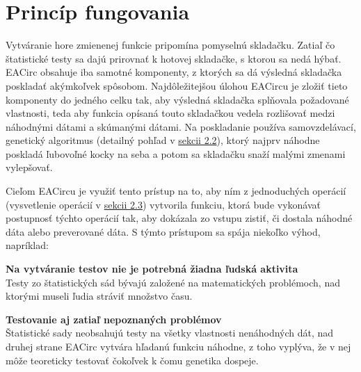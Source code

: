 \section{Princíp fungovania}
\label{sec:principle}

Vytváranie hore zmienenej funkcie pripomína pomyselnú skladačku. Zatiaľ čo štatistické testy sa dajú prirovnať k hotovej skladačke, s ktorou sa nedá hýbať. EACirc obsahuje iba samotné komponenty, z ktorých sa dá výsledná skladačka poskladať akýmkoľvek spôsobom. Najdôležitejšou úlohou EACircu je zložiť tieto komponenty do jedného celku tak, aby výsledná skladačka splňovala požadované vlastnosti, teda aby funkcia opísaná touto skladačkou vedela rozlišovať medzi náhodnými dátami a skúmanými dátami. Na poskladanie používa samovzdelávací, genetický algoritmus (detailný pohľad v \hyperref[sec:genetics]{sekcii 2.2}), ktorý najprv náhodne poskladá ľubovoľné kocky na seba a potom sa skladačku snaží malými zmenami vylepšovať.

Cieľom EACircu je využiť tento prístup na to, aby ním z jednoduchých operácií (vysvetlenie operácií v \hyperref[sec:nodes]{sekcii 2.3}) vytvorila funkciu, ktorá bude vykonávať postupnosť týchto operácií tak, aby dokázala zo vstupu zistiť, či dostala náhodné dáta alebo preverované dáta. S týmto prístupom sa spája niekoľko výhod, napríklad:
\begin{myItemize}
	\item \textbf{Na vytváranie testov nie je potrebná žiadna ľudská aktivita}\\Testy zo štatistických sád bývajú založené na matematických problémoch, nad ktorými museli ľudia stráviť množstvo času.
	\item \textbf{Testovanie aj zatiaľ nepoznaných problémov}\\Štatistické sady neobsahujú testy na všetky vlastnosti nenáhodných dát, nad druhej strane EACirc vytvára hľadanú funkciu náhodne, z toho vyplýva, že v nej môže teoreticky testovať čokoľvek k čomu genetika dospeje.
\end{myItemize}


